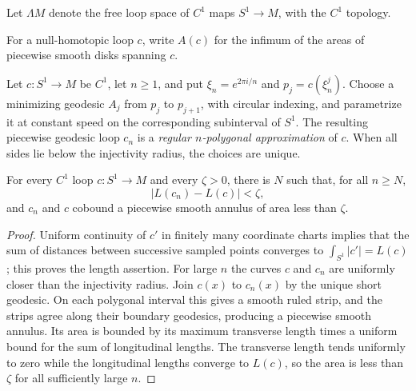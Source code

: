 Let $\Lambda M$ denote the free loop space of $C^1$ maps $S^1\to M$, with
the $C^1$ topology.

For a null-homotopic loop $c$, write $A(c)$ for the infimum of the areas of
piecewise smooth disks spanning $c$.

\begin{definition}
\label{def:regular-polygonal-loop-approximation}
\notready
Let $c\colon S^1\to M$ be $C^1$, let $n\ge1$, and put
$\xi_n=e^{2\pi i/n}$ and $p_j=c(\xi_n^j)$.  Choose a minimizing geodesic
$A_j$ from $p_j$ to $p_{j+1}$, with circular indexing, and parametrize it at
constant speed on the corresponding subinterval of $S^1$.  The resulting
piecewise geodesic loop $c_n$ is a \emph{regular $n$-polygonal approximation}
of $c$.  When all sides lie below the injectivity radius, the choices are
unique.
\end{definition}

\begin{theorem}
\label{lem:single-loop-polygonal-approximation}
\notready
For every $C^1$ loop $c\colon S^1\to M$ and every $\zeta>0$, there is
$N$ such that, for all $n\ge N$,
\[
 |L(c_n)-L(c)|<\zeta,
\]
and $c_n$ and $c$ cobound a piecewise smooth annulus of area less than
$\zeta$.
\end{theorem}
\begin{proof}
Uniform continuity of $c'$ in finitely many coordinate charts implies that
the sum of distances between successive sampled points converges to
$\int_{S^1}|c'|=L(c)$; this proves the length assertion.  For large $n$ the
curves $c$ and $c_n$ are uniformly closer than the injectivity radius.  Join
$c(x)$ to $c_n(x)$ by the unique short geodesic.  On each polygonal interval
this gives a smooth ruled strip, and the strips agree along their boundary
geodesics, producing a piecewise smooth annulus.  Its area is bounded by its
maximum transverse length times a uniform bound for the sum of longitudinal
lengths.  The transverse length tends uniformly to zero while the
longitudinal lengths converge to $L(c)$, so the area is less than $\zeta$
for all sufficiently large $n$.
\end{proof}

